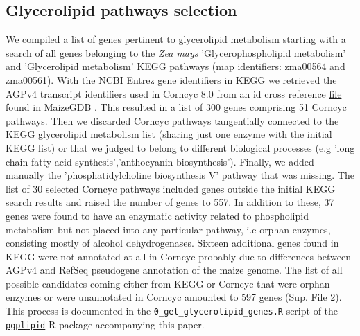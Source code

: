 \subsection{Glycerolipid pathways selection}
We compiled a list of genes pertinent to glycerolipid metabolism starting with a search of all genes belonging to the \textit{Zea mays} 'Glycerophospholipid metabolism' and 'Glycerolipid metabolism' KEGG pathways \citep{kanehisa2019} (map identifiers: zma00564 and zma00561). 
With the NCBI Entrez gene identifiers in KEGG we retrieved the AGPv4 transcript identifiers used in Corncyc 8.0 \citep{portwood2019, walsh2016} from an id cross reference \href{https://www.maizegdb.org/search/gene/download_gene_xrefs.php?relative=v4}{file} found in MaizeGDB   \citep{portwood2019}.
This resulted in a list of 300 genes comprising 51 Corncyc pathways. 
Then we discarded Corncyc pathways  tangentially connected to the KEGG glycerolipid metabolism list (sharing just one enzyme with the initial KEGG list) or that we judged to belong to different biological processes (e.g 'long chain fatty acid synthesis','anthocyanin biosynthesis'). 
Finally, we added manually the 'phosphatidylcholine biosynthesis V' pathway that was missing. 
The list of 30 selected Corncyc pathways included genes outside the initial KEGG search results and raised the number of genes to 557. 
In addition to these, 37 genes were found to have an enzymatic activity related to phospholipid metabolism but not placed into any particular pathway, i.e orphan enzymes, consisting mostly of alcohol dehydrogenases. 
Sixteen additional genes found in KEGG were not annotated at all in Corncyc probably due to differences between AGPv4 and RefSeq pseudogene annotation of the maize genome. 
The list of all possible candidates coming either from KEGG or Corncyc that were orphan enzymes or were unannotated in Corncyc amounted to 597 genes (Sup. File 2). 
This process is documented in the \verb|0_get_glycerolipid_genes.R| script of the \href{https://github.com/sawers-rellan-labs/pglipid}{\texttt{pgplipid}} R package accompanying this paper.

